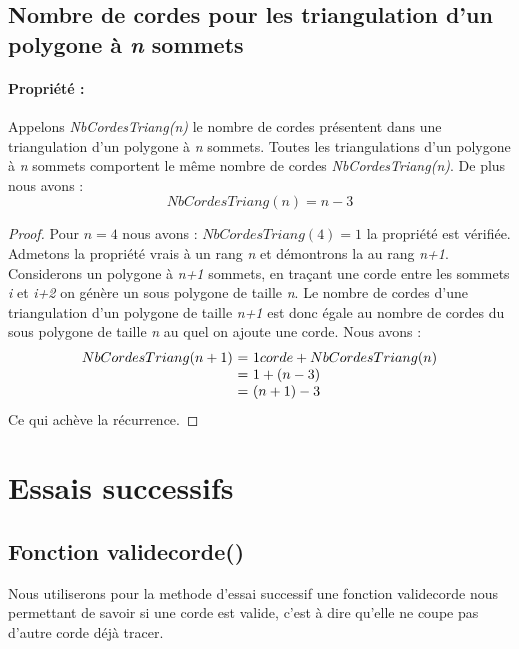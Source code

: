 \documentclass[a4paper,10pt]{article}
\begin{document}
\subsection{Nombre de cordes pour les triangulation d'un polygone à \emph{n} sommets}

\paragraph{Propriété :}  
Appelons \emph{NbCordesTriang(n)} le nombre de cordes présentent dans une triangulation d'un polygone à \emph{n} sommets.
Toutes les triangulations d'un polygone à \emph{n} sommets comportent le même nombre de cordes \emph{NbCordesTriang(n)}.
De plus nous avons :
\begin{equation} 
NbCordesTriang(n) = n-3
\end{equation}

\begin{proof}
Pour \(n = 4\) nous avons : \(NbCordesTriang(4) = 1 \) la propriété est vérifiée. \\
Admetons la propriété vrais à un rang \emph{n} et démontrons la au rang \emph{n+1}. \\
Considerons un polygone à \emph{n+1} sommets, en traçant une corde entre les sommets \emph{i} et \emph{i+2} on génère un sous polygone de taille \emph{n}.
Le nombre de cordes d'une triangulation d'un polygone de taille \emph{n+1} est donc égale au nombre de cordes du sous polygone de taille \emph{n} au quel on ajoute une corde.
Nous avons :\\
\[
\begin{array}{r @{=} l}
NbCordesTriang(n+1) \ & \  1 corde + NbCordesTriang(n) \\
			  & \ 1 + (n-3) \\
			  & \ (n+1) - 3
\end{array}
\]
Ce qui achève la récurrence.
\end{proof}


\section{Essais successifs}

\subsection{Fonction validecorde()}


Nous utiliserons pour la methode d'essai successif une fonction validecorde nous permettant de savoir si une corde est valide, c'est à dire qu'elle ne coupe pas d'autre corde déjà tracer.
\end{document}

